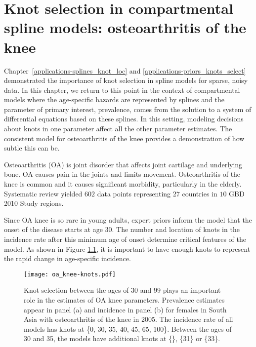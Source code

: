\chapter{Knot selection in compartmental spline models: osteoarthritis of the knee}
\label{applications-con_fit_splines}

Chapter~\ref{applications-splines_knot_loc} and
\ref{applications-priors_knots_select} demonstrated the importance of
knot selection in spline models for sparse, noisy data. In this
chapter, we return to this point in the context of compartmental
models where the age-specific hazards are represented by splines and
the parameter of primary interest, prevalence, comes from the solution
to a system of differential equations based on these splines. In this
setting, modeling decisions about knots in one parameter affect all
the other parameter estimates.  The consistent model for
osteoarthritis of the knee provides a demonstration of how subtle this
can be.

Osteoarthritis (OA) is joint disorder that affects joint cartilage and
underlying bone.  OA causes pain in the joints and limits movement.
Osteoarthritis of the knee is common and it causes significant
morbidity, particularly in the
elderly. \cite{felson_epidemiology_1988, felson_incidence_1995}
Systematic review yielded $602$ data points representing $27$ countries
in $10$ GBD 2010 Study regions.

Since OA knee is so rare in young adults, expert priors inform the
model that the onset of the disease starts at age 30.  The number and
location of knots in the incidence rate after this minimum age of
onset determine critical features of the model. As shown in Figure
\ref{fig:app-oa knee knots}, it is important to have enough knots to
represent the rapid change in age-specific incidence.

    \begin{figure}[h]
        \begin{center}
            \texttt{[image: oa\_knee-knots.pdf]}
            \caption{Knot selection between the ages of 30 and 99
              plays an important role in the estimates of OA knee
              parameters.  Prevalence estimates appear
              in panel (a) and incidence in panel (b) for females in
              South Asia with osteoarthritis of the knee in 2005.  The
              incidence rate of all models has knots at \{0, 30, 35,
              40, 45, 65, 100\}.  Between the ages
              of 30 and 35, the models have additional knots at \{\}, \{31\}
              or \{33\}.}
            \label{fig:app-oa knee knots}
        \end{center}
    \end{figure}

